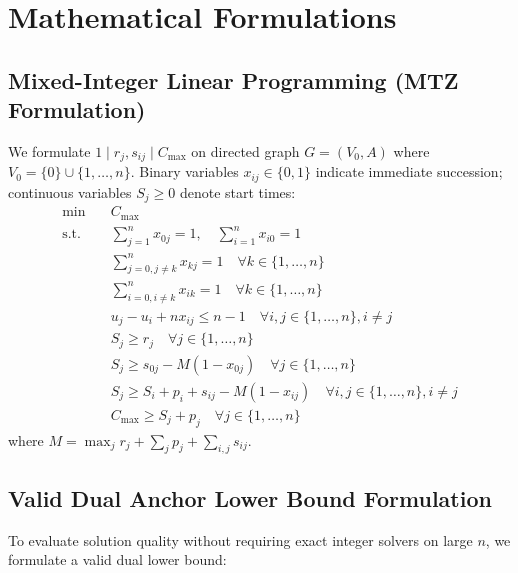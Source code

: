 \documentclass[journal]{IEEEtran}
\begin{document}
\section{Mathematical Formulations}
\label{sec:formulations}

\subsection{Mixed-Integer Linear Programming (MTZ Formulation)}
We formulate $1 \mid r_j, s_{ij} \mid C_{\max}$ on directed graph $G = (V_0, A)$ where $V_0 = \{0\} \cup \{1, \dots, n\}$. Binary variables $x_{ij} \in \{0, 1\}$ indicate immediate succession; continuous variables $S_j \ge 0$ denote start times:
\begin{align}
    \min \quad & C_{\max} \\
    \text{s.t.} \quad & \sum_{j=1}^n x_{0j} = 1, \quad \sum_{i=1}^n x_{i0} = 1 \label{eq:depot_flow} \\
    & \sum_{j=0, j \ne k}^n x_{kj} = 1 \quad \forall k \in \{1, \dots, n\} \label{eq:out_flow} \\
    & \sum_{i=0, i \ne k}^n x_{ik} = 1 \quad \forall k \in \{1, \dots, n\} \label{eq:in_flow} \\
    & u_j - u_i + n x_{ij} \le n - 1 \quad \forall i, j \in \{1, \dots, n\}, i \ne j \label{eq:mtz} \\
    & S_j \ge r_j \quad \forall j \in \{1, \dots, n\} \label{eq:release} \\
    & S_j \ge s_{0j} - M(1 - x_{0j}) \quad \forall j \in \{1, \dots, n\} \label{eq:start_depot} \\
    & S_j \ge S_i + p_i + s_{ij} - M(1 - x_{ij}) \quad \forall i, j \in \{1, \dots, n\}, i \ne j \label{eq:precedence} \\
    & C_{\max} \ge S_j + p_j \quad \forall j \in \{1, \dots, n\} \label{eq:cmax}
\end{align}
where $M = \max_j r_j + \sum_j p_j + \sum_{i,j} s_{ij}$.

\subsection{Valid Dual Anchor Lower Bound Formulation}
To evaluate solution quality without requiring exact integer solvers on large $n$, we formulate a valid dual lower bound:
\end{document}
